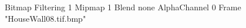 {Bitmap
	{Filtering 1}
	{Mipmap 1}
	{Blend none}
	{AlphaChannel 0}
	{Frame "HouseWall08.tif.bmp"}
}
